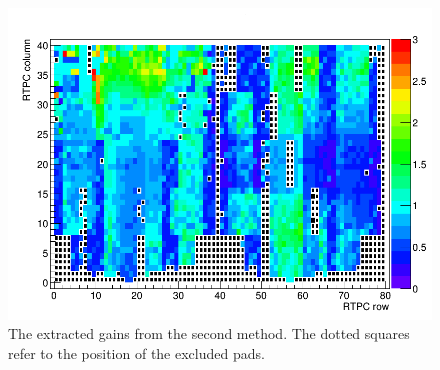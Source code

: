 
\begin{figure}[tbp]
\centering
\includegraphics[scale=0.300]{fig_rtpc/pad_row_col.png}
\caption{The extracted gains from the second method. The dotted squares refer 
to the position of the excluded pads.}
\label{fig:pad_row_col}
\end{figure}

